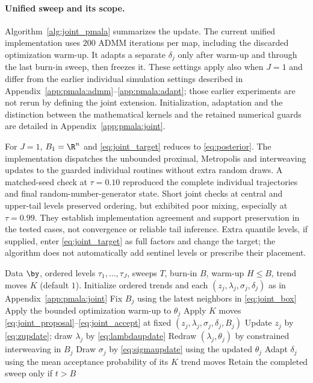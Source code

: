 \paragraph{Unified sweep and its scope.} Algorithm~\ref{alg:joint_pmala} summarizes the update. The current unified implementation uses $200$ ADMM iterations per map, including the discarded optimization warm-up. It adapts a separate $\delta_j$ only after warm-up and through the last burn-in sweep, then freezes it. These settings apply also when $J=1$ and differ from the earlier individual simulation settings described in Appendix~\ref{app:pmala:admm}--\ref{app:pmala:adapt}; those earlier experiments are not rerun by defining the joint extension. Initialization, adaptation and the distinction between the mathematical kernels and the retained numerical guards are detailed in Appendix~\ref{app:pmala:joint}.

For $J=1$, $B_1=\R^n$ and \eqref{eq:joint_target} reduces to \eqref{eq:posterior}. The implementation dispatches the unbounded proximal, Metropolis and interweaving updates to the guarded individual routines without extra random draws. A matched-seed check at $\tau=0.10$ reproduced the complete individual trajectories and final random-number-generator state. Short joint checks at central and upper-tail levels preserved ordering, but exhibited poor mixing, especially at $\tau=0.99$. They establish implementation agreement and support preservation in the tested cases, not convergence or reliable tail inference. Extra quantile levels, if supplied, enter \eqref{eq:joint_target} as full factors and change the target; the algorithm does not automatically add sentinel levels or prescribe their placement.

\begin{algorithm}[!htbp]
\caption{Unified Bayesian-PMALA for ordered quantile levels}
\label{alg:joint_pmala}
\begin{algorithmic}[1]
\Require Data $\by$, ordered levels $\tau_1,\ldots,\tau_J$, sweeps $T$, burn-in $B$, warm-up $H\leq B$, trend moves $K$ (default $1$).
\State Initialize ordered trends and each $(z_j,\lambda_j,\sigma_j,\delta_j)$ as in Appendix~\ref{app:pmala:joint}
        \State Fix $B_j$ using the latest neighbors in \eqref{eq:joint_box}
            \State Apply the bounded optimization warm-up to $\theta_j$
        \Else
            \State Apply $K$ moves \eqref{eq:joint_proposal}--\eqref{eq:joint_accept} at fixed $(z_j,\lambda_j,\sigma_j,\delta_j,B_j)$
        \EndIf
        \State Update $z_j$ by \eqref{eq:zupdate}; draw $\lambda_j$ by \eqref{eq:lambdaupdate}
            \State Redraw $(\lambda_j,\theta_j)$ by constrained interweaving in $B_j$
        \EndIf
        \State Draw $\sigma_j$ by \eqref{eq:sigmaupdate} using the updated $\theta_j$
            \State Adapt $\delta_j$ using the mean acceptance probability of its $K$ trend moves
        \EndIf
    \EndFor
    \State Retain the completed sweep only if $t>B$
\EndFor
\end{algorithmic}
\end{algorithm}
